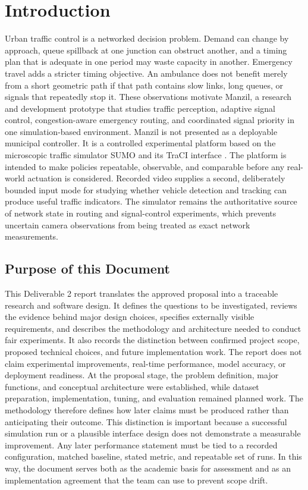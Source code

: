 \chapter{Introduction}
\label{ch:introduction}

Urban traffic control is a networked decision problem. Demand can change by approach, queue spillback at one junction can obstruct another, and a timing plan that is adequate in one period may waste capacity in another. Emergency travel adds a stricter timing objective. An ambulance does not benefit merely from a short geometric path if that path contains slow links, long queues, or signals that repeatedly stop it. These observations motivate Manzil, a research and development prototype that studies traffic perception, adaptive signal control, congestion-aware emergency routing, and coordinated signal priority in one simulation-based environment. Manzil is not presented as a deployable municipal controller. It is a controlled experimental platform based on the microscopic traffic simulator SUMO and its TraCI interface \cite{lopez2018sumo,sumodocs}. The platform is intended to make policies repeatable, observable, and comparable before any real-world actuation is considered. Recorded video supplies a second, deliberately bounded input mode for studying whether vehicle detection and tracking can produce useful traffic indicators. The simulator remains the authoritative source of network state in routing and signal-control experiments, which prevents uncertain camera observations from being treated as exact network measurements.

\section{Purpose of this Document}

This Deliverable 2 report translates the approved proposal into a traceable research and software design. It defines the questions to be investigated, reviews the evidence behind major design choices, specifies externally visible requirements, and describes the methodology and architecture needed to conduct fair experiments. It also records the distinction between confirmed project scope, proposed technical choices, and future implementation work. The report does not claim experimental improvements, real-time performance, model accuracy, or deployment readiness. At the proposal stage, the problem definition, major functions, and conceptual architecture were established, while dataset preparation, implementation, tuning, and evaluation remained planned work. The methodology therefore defines how later claims must be produced rather than anticipating their outcome. This distinction is important because a successful simulation run or a plausible interface design does not demonstrate a measurable improvement. Any later performance statement must be tied to a recorded configuration, matched baseline, stated metric, and repeatable set of runs. In this way, the document serves both as the academic basis for assessment and as an implementation agreement that the team can use to prevent scope drift.

